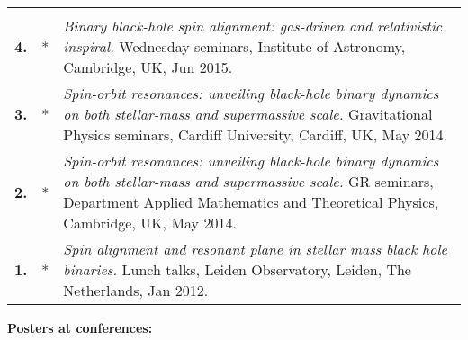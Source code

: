 \documentclass[a4paper]{moderncv}
\begin{document}
{\begin{longtable}{rp{0.4cm}p{15.8cm}}
\vspace{0.05cm}\\
%
\textbf{4.} & *& \textit{Binary black-hole spin alignment: gas-driven and relativistic inspiral.}
\newline{} 
Wednesday seminars, Institute of Astronomy, Cambridge, UK, Jun 2015.\vspace{0.05cm}\\
%
\textbf{3.} & *& \textit{Spin-orbit resonances: unveiling black-hole binary dynamics on both stellar-mass and supermassive scale.}
\newline{} 
Gravitational Physics seminars, Cardiff University, Cardiff, UK, May 2014.
\vspace{0.05cm}\\
%
\textbf{2.} & *& \textit{Spin-orbit resonances: unveiling black-hole binary dynamics on both stellar-mass and supermassive scale.}
\newline{} 
GR seminars, Department Applied Mathematics and Theoretical Physics, Cambridge, UK, May 2014.
\vspace{0.05cm}\\
%
\textbf{1.} & *& \textit{Spin alignment and resonant plane in stellar mass black hole binaries.}
\newline{} 
Lunch talks, Leiden Observatory, Leiden, The Netherlands, Jan 2012.
\vspace{0.05cm}\\
%
\end{longtable}
}


\textcolor{color1}{\textbf{Posters at conferences:}}
\end{document}
